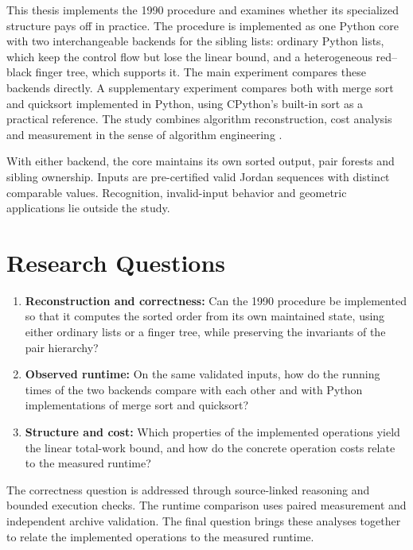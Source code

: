 This thesis implements the 1990 procedure and examines whether its
specialized structure pays off in practice. The procedure is implemented as one
Python core with two interchangeable backends for the sibling lists: ordinary
Python lists, which keep the control flow but lose the linear bound, and a
heterogeneous red--black finger tree, which supports it. The main experiment compares these backends directly.
A supplementary experiment compares both with merge sort and quicksort
implemented in Python, using CPython's built-in sort as a practical reference. The study combines algorithm reconstruction,
cost analysis and measurement in the sense of algorithm engineering
\parencites{sanders2009engineering}{mcgeoch2012guide}.

With either backend, the core maintains its own sorted output, pair forests
and sibling ownership. Inputs are pre-certified valid Jordan sequences with
distinct comparable values. Recognition, invalid-input behavior and geometric applications lie outside the study.

\section{Research Questions}
\label{sec:introduction-questions}

\begin{enumerate}[label=\textbf{RQ\arabic*:},leftmargin=*]
\item \textbf{Reconstruction and correctness:} Can the 1990 procedure be
implemented so that it computes the sorted order from its own maintained
state, using either ordinary lists or a finger tree, while preserving the
invariants of the pair hierarchy?
\item \textbf{Observed runtime:} On the same validated inputs, how do the
running times of the two backends compare with each other and with Python
implementations of merge sort and quicksort?
\item \textbf{Structure and cost:} Which properties of the implemented
operations yield the linear total-work bound, and how do the concrete
operation costs relate to the measured runtime?
\end{enumerate}

The correctness question is addressed through source-linked reasoning and
bounded execution checks. The runtime comparison uses paired measurement and
independent archive validation. The final question brings these analyses
together to relate the implemented operations to the measured runtime.

